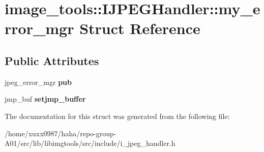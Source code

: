 \hypertarget{structimage__tools_1_1IJPEGHandler_1_1my__error__mgr}{}\section{image\+\_\+tools\+:\+:I\+J\+P\+E\+G\+Handler\+:\+:my\+\_\+error\+\_\+mgr Struct Reference}
\label{structimage__tools_1_1IJPEGHandler_1_1my__error__mgr}
\subsection*{Public Attributes}
\begin{DoxyCompactItemize}
\item 
jpeg\+\_\+error\+\_\+mgr {\bfseries pub}\hypertarget{structimage__tools_1_1IJPEGHandler_1_1my__error__mgr_a694c7e412f46360915c5fb04177be3d1}{}\label{structimage__tools_1_1IJPEGHandler_1_1my__error__mgr_a694c7e412f46360915c5fb04177be3d1}

\item 
jmp\+\_\+buf {\bfseries setjmp\+\_\+buffer}\hypertarget{structimage__tools_1_1IJPEGHandler_1_1my__error__mgr_a04d55d4d48759139292dd8ddfdd66b72}{}\label{structimage__tools_1_1IJPEGHandler_1_1my__error__mgr_a04d55d4d48759139292dd8ddfdd66b72}

\end{DoxyCompactItemize}


The documentation for this struct was generated from the following file\+:\begin{DoxyCompactItemize}
\item 
/home/xuxx0987/haha/repo-\/group-\/\+A01/src/lib/libimgtools/src/include/i\+\_\+jpeg\+\_\+handler.\+h\end{DoxyCompactItemize}
